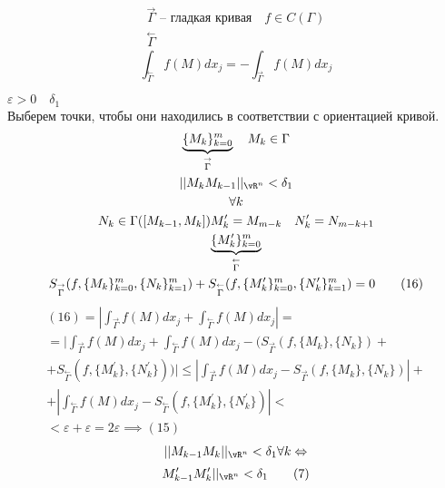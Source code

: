 \documentclass[main]{subfiles}
\begin{document}
\begin{theorem}
    \begin{gather*}
        \stackrel{\rightarrow}{\Gamma} \text{ -- гладкая кривая} \quad f \in C(\Gamma) \\
        \stackrel{\leftarrow}{\Gamma}
    \end{gather*}
    \[ \int_{\stackrel{\leftarrow}{\Gamma}} f(M)dx_j = - \int_{\stackrel{\rightarrow}{\Gamma}} f(M)dx_j \tag{15} \]
\end{theorem}
\begin{longProof}
    $\varepsilon > 0 \quad \delta_1$\\
    Выберем точки, чтобы они находились в соответствии с ориентацией кривой.
    \begin{gather*}
        \underbrace{\{ M_k \}^m_{k=0}}_{\stackrel{\rightarrow}{\Gamma}} \quad M_k \in \Gamma \\
        ||M_kM_{k-1}||_{{\vR^n}} < \delta_1 \\
        \forall k \\
        N_k \in \Gamma([M_{k-1},M_k])
        M^\prime_k = M_{m-k} \quad N^\prime_k = N_{m-k+1}\\
        \underbrace{\{ M^\prime_k \}^m_{k=0}}_{\stackrel{\leftarrow}{\Gamma}}\\
        S_{\stackrel{\rightarrow}{\Gamma}}(f, \{M_k\}^m_{k=0}, \{N_k\}^m_{k=1}) +
        S_{\stackrel{\leftarrow}{\Gamma}}(f, \{M^\prime_k\}^m_{k=0}, \{N^\prime_k\}^m_{k=1}) = 0 \tag{16}
    \end{gather*}
    \begin{multline*}
        (16) = \left| \int_{\stackrel{\rightarrow}{\Gamma}}f(M)dx_j + \int_{\stackrel{\leftarrow}{\Gamma}} f(M)dx_j \right| = \\
        =  \bigg| \int_{\stackrel{\rightarrow}{\Gamma}} f(M)dx_j + \int_{\stackrel{\leftarrow}{\Gamma}} f(M)dx_j  -
        (S_{\stackrel{\rightarrow}{\Gamma}}(f, \{M_k\}, \{N_k\}) + \\
        + S_{\stackrel{\leftarrow}{\Gamma}}(f, \{M^\prime_k\}, \{N^\prime_k\})) \bigg|
        \leq \left| \int_{\stackrel{\rightarrow}{\Gamma}}f(M)dx_j - S_{\stackrel{\rightarrow}{\Gamma}}(f, \{M_k\},\{N_k\}) \right| + \\
        + \left| \int_{\stackrel{\leftarrow}{\Gamma}} f(M)dx_j-S_{\stackrel{\leftarrow}{\Gamma}}(f, \{ M^\prime_k\},\{ N^\prime_k\} ) \right| < \\
        < \varepsilon + \varepsilon = 2\varepsilon \implies(15)
    \end{multline*}
    \[|| M_{k-1}M_k||_{{\vR^n}} < \delta_1 \forall k \Leftrightarrow \]
    \[M^\prime_{k-1}M^\prime_{k}||_{{\vR^n}} < \delta_1 \tag{7}\]
\end{longProof}
\end{document}
